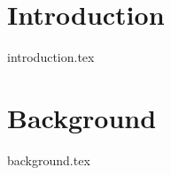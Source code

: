 \documentclass{l4proj}
\begin{document}
\def\consentname {Ben Johnston} %
\def\consentdate {26 January 2023} %
\educationalconsent


\tableofcontents
\newpage
\listoffigures

%
%
%
%
%
%
%
%
\chapter{Introduction}

{introduction.tex}

\chapter{Background}\label{bg}
{background.tex}

\end{document}
